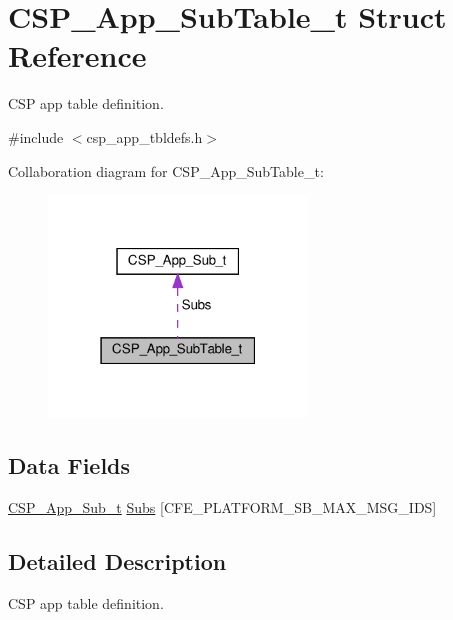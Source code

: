 \hypertarget{structCSP__App__SubTable__t}{}\section{C\+S\+P\+\_\+\+App\+\_\+\+Sub\+Table\+\_\+t Struct Reference}
\label{structCSP__App__SubTable__t}


C\+SP app table definition.  




{\ttfamily \#include $<$csp\+\_\+app\+\_\+tbldefs.\+h$>$}



Collaboration diagram for C\+S\+P\+\_\+\+App\+\_\+\+Sub\+Table\+\_\+t\+:
\nopagebreak
\begin{figure}[H]
\begin{center}
\leavevmode
\includegraphics[width=195pt]{structCSP__App__SubTable__t__coll__graph}
\end{center}
\end{figure}
\subsection*{Data Fields}
\begin{DoxyCompactItemize}
\item 
\hyperlink{structCSP__App__Sub__t}{C\+S\+P\+\_\+\+App\+\_\+\+Sub\+\_\+t} \hyperlink{structCSP__App__SubTable__t_a5a681cdd91bf7ea81d12241f3edd335b}{Subs} \mbox{[}C\+F\+E\+\_\+\+P\+L\+A\+T\+F\+O\+R\+M\+\_\+\+S\+B\+\_\+\+M\+A\+X\+\_\+\+M\+S\+G\+\_\+\+I\+DS\mbox{]}
\end{DoxyCompactItemize}


\subsection{Detailed Description}
C\+SP app table definition. 

